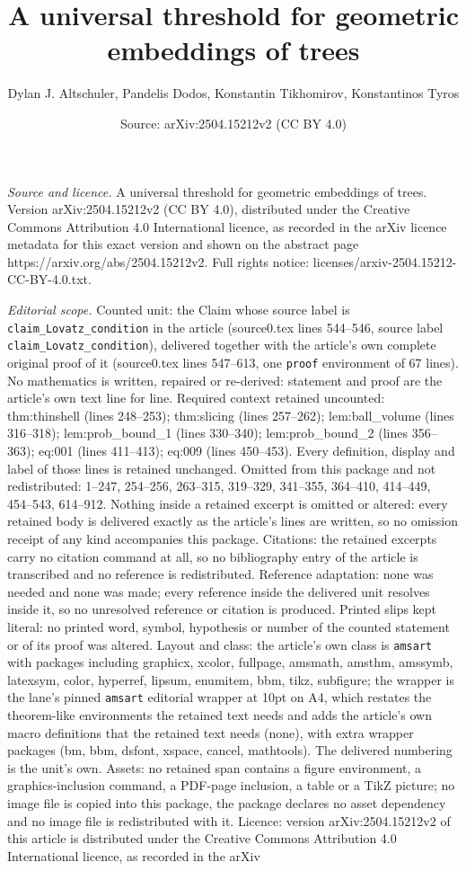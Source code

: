 \documentclass[10pt,a4paper]{amsart}
\title[A universal threshold for geometric embeddings of trees]{A universal threshold for geometric embeddings of trees}
\author{Dylan J. Altschuler, Pandelis Dodos, Konstantin Tikhomirov, Konstantinos Tyros}
\date{Source: arXiv:2504.15212v2 (CC BY 4.0)}
\begin{document}
\maketitle

\noindent\emph{Source and licence.} A universal threshold for geometric embeddings of trees. Version arXiv:2504.15212v2 (CC BY 4.0), distributed under the Creative Commons Attribution 4.0 International licence, as recorded in the arXiv licence metadata for this exact version and shown on the abstract page https://arxiv.org/abs/2504.15212v2. Full rights notice: licenses/arxiv-2504.15212-CC-BY-4.0.txt.\par\smallskip

\noindent\textit{Editorial scope.} Counted unit: the Claim whose source label is \texttt{claim\_Lovatz\_condition} in the article (source0.tex lines 544--546, source label \texttt{claim\_Lovatz\_condition}), delivered together with the article's own complete original proof of it (source0.tex lines 547--613, one \texttt{proof} environment of 67 lines). No mathematics is written, repaired or re-derived: statement and proof are the article's own text line for line. Required context retained uncounted: thm:thinshell (lines 248--253); thm:slicing (lines 257--262); lem:ball\_volume (lines 316--318); lem:prob\_bound\_1 (lines 330--340); lem:prob\_bound\_2 (lines 356--363); eq:001 (lines 411--413); eq:009 (lines 450--453). Every definition, display and label of those lines is retained unchanged. Omitted from this package and not redistributed: 1--247, 254--256, 263--315, 319--329, 341--355, 364--410, 414--449, 454--543, 614--912. Nothing inside a retained excerpt is omitted or altered: every retained body is delivered exactly as the article's lines are written, so no omission receipt of any kind accompanies this package. Citations: the retained excerpts carry no citation command at all, so no bibliography entry of the article is transcribed and no reference is redistributed. Reference adaptation: none was needed and none was made; every reference inside the delivered unit resolves inside it, so no unresolved reference or citation is produced. Printed slips kept literal: no printed word, symbol, hypothesis or number of the counted statement or of its proof was altered. Layout and class: the article's own class is \texttt{amsart} with packages including graphicx, xcolor, fullpage, amsmath, amsthm, amssymb, latexsym, color, hyperref, lipsum, enumitem, bbm, tikz, subfigure; the wrapper is the lane's pinned \texttt{amsart} editorial wrapper at 10pt on A4, which restates the theorem-like environments the retained text needs and adds the article's own macro definitions that the retained text needs (none), with extra wrapper packages (bm, bbm, dsfont, xspace, cancel, mathtools). The delivered numbering is the unit's own. Assets: no retained span contains a figure environment, a graphics-inclusion command, a PDF-page inclusion, a table or a TikZ picture; no image file is copied into this package, the package declares no asset dependency and no image file is redistributed with it. Licence: version arXiv:2504.15212v2 of this article is distributed under the Creative Commons Attribution 4.0 International licence, as recorded in the arXiv 
\end{document}
